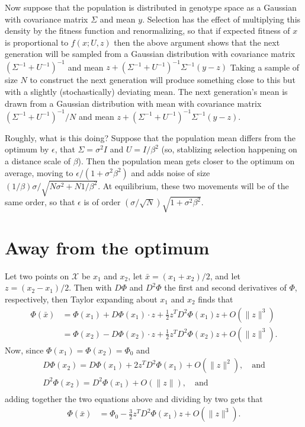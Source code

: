 \documentclass{article}
\newcommand{\1}{\mathbbm{1}}
\newcommand{\optx}{\mathcal{X}}
\newcommand{\optph}{\Phi_0}
\begin{document}
Now suppose that the population is distributed in genotype space
as a Gaussian with covariance matrix $\Sigma$ and mean $y$.
Selection has the effect of multiplying this density by the fitness function and renormalizing,
so that if expected fitness of $x$ is proportional to $f(x;U,z)$
then the above argument shows that the next generation will be sampled from a Gaussian distribution
with covariance matrix $(\Sigma^{-1} + U^{-1})^{-1}$ 
and mean $z + (\Sigma^{-1}+U^{-1})^{-1} \Sigma^{-1} (y-z)$
Taking a sample of size $N$ to construct the next generation 
will produce something close to this but with a slightly (stochastically) deviating mean.
The next generation's mean is drawn from a Gaussian distribution with mean
with covariance matrix $(\Sigma^{-1} + U^{-1})^{-1}/N$ 
and mean $z + (\Sigma^{-1}+U^{-1})^{-1} \Sigma^{-1} (y-z)$.

Roughly, what is this doing?
Suppose that the population mean differs from the optimum by $\epsilon$,
that $\Sigma = \sigma^2 I$ and $U = I/\beta^2$ (so, stablizing selection happening on a distance scale of $\beta$).
Then the population mean gets closer to the optimum on average, moving to
$\epsilon/(1 + \sigma^2 \beta^2)$
and adds noise of size $(1/\beta) \sigma/\sqrt{N \sigma^2 + N 1/\beta^2}$.
At equilibrium, these two movements will be of the same order,
so that $\epsilon$ is of order $(\sigma/\sqrt{N}) \sqrt{1+\sigma^2 \beta^2}$.


\section{Away from the optimum}
\label{apx:away_from_opt}

Let two points  on $\optx$ be $x_1$ and $x_2$, let $\bar x = (x_1+x_2)/2$, and let $z=(x_2 - x_1)/2$.
Then with $D \Phi$ and $D^2 \Phi$ the first and second derivatives of $\Phi$, respectively,
then Taylor expanding about $x_1$ and $x_2$ finds that
\begin{align*}
    \Phi(\bar x) 
    &= \Phi(x_1) + D\Phi(x_1) \cdot z + \frac{1}{2} z^T D^2 \Phi(x_1) z + O(\|z\|^3) \\
    &= \Phi(x_2) - D\Phi(x_2) \cdot z + \frac{1}{2} z^T D^2 \Phi(x_2) z + O(\|z\|^3) .
\end{align*}
Now, since $\Phi(x_1) = \Phi(x_2) = \optph$ and
\begin{align*}
    D\Phi(x_2) = D\Phi(x_1) + 2 z^T D^2 \Phi(x_1) + O(\|z\|^2), \quad \text{and} \\
    D^2\Phi(x_2) = D^2\Phi(x_1) + O(\|z\|), \quad \text{and} \\
\end{align*}
adding together the two equations above and dividing by two gets that
\begin{align*}
    \Phi(\bar x) 
    &= \optph - \frac{3}{2} z^T D^2 \Phi(x_1) z + O(\|z\|^3) .
\end{align*}
\end{document}
